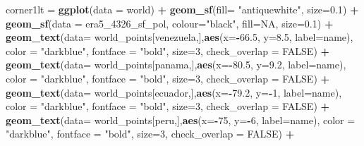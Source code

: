 \documentclass[12pt,twoside]{reedthesis}
\newenvironment{Shaded}{\begin{snugshade}}{\end{snugshade}}
\newcommand{\DataTypeTok}[1]{\textcolor[rgb]{0.13,0.29,0.53}{#1}}
\newcommand{\DecValTok}[1]{\textcolor[rgb]{0.00,0.00,0.81}{#1}}
\newcommand{\FloatTok}[1]{\textcolor[rgb]{0.00,0.00,0.81}{#1}}
\newcommand{\KeywordTok}[1]{\textcolor[rgb]{0.13,0.29,0.53}{\textbf{#1}}}
\newcommand{\NormalTok}[1]{#1}
\newcommand{\OperatorTok}[1]{\textcolor[rgb]{0.81,0.36,0.00}{\textbf{#1}}}
\newcommand{\OtherTok}[1]{\textcolor[rgb]{0.56,0.35,0.01}{#1}}
\newcommand{\StringTok}[1]{\textcolor[rgb]{0.31,0.60,0.02}{#1}}
\begin{document}
\begin{Shaded}
\begin{Highlighting}[]
\NormalTok{corner1lt =}\StringTok{ }\KeywordTok{ggplot}\NormalTok{(}\DataTypeTok{data =}\NormalTok{ world) }\OperatorTok{+}\StringTok{ }
\StringTok{  }\KeywordTok{geom_sf}\NormalTok{(}\DataTypeTok{fill=} \StringTok{"antiquewhite"}\NormalTok{,  }\DataTypeTok{size=}\FloatTok{0.1}\NormalTok{) }\OperatorTok{+}\StringTok{ }
\StringTok{  }\KeywordTok{geom_sf}\NormalTok{(}\DataTypeTok{data =}\NormalTok{ era5_}\DecValTok{4326}\NormalTok{_sf_pol, }\DataTypeTok{colour=}\StringTok{"black"}\NormalTok{, }\DataTypeTok{fill=}\OtherTok{NA}\NormalTok{, }\DataTypeTok{size=}\FloatTok{0.1}\NormalTok{) }\OperatorTok{+}
\StringTok{  }\KeywordTok{geom_text}\NormalTok{(}\DataTypeTok{data=}\NormalTok{ world_points[venezuela,],}\KeywordTok{aes}\NormalTok{(}\DataTypeTok{x=}\OperatorTok{-}\FloatTok{66.5}\NormalTok{, }\DataTypeTok{y=}\FloatTok{8.5}\NormalTok{, }\DataTypeTok{label=}\NormalTok{name), }\DataTypeTok{color =} \StringTok{"darkblue"}\NormalTok{, }\DataTypeTok{fontface =} \StringTok{"bold"}\NormalTok{, }\DataTypeTok{size=}\DecValTok{3}\NormalTok{, }\DataTypeTok{check_overlap =} \OtherTok{FALSE}\NormalTok{) }\OperatorTok{+}
\StringTok{  }\KeywordTok{geom_text}\NormalTok{(}\DataTypeTok{data=}\NormalTok{ world_points[panama,],}\KeywordTok{aes}\NormalTok{(}\DataTypeTok{x=}\OperatorTok{-}\FloatTok{80.5}\NormalTok{, }\DataTypeTok{y=}\FloatTok{9.2}\NormalTok{, }\DataTypeTok{label=}\NormalTok{name), }\DataTypeTok{color =} \StringTok{"darkblue"}\NormalTok{, }\DataTypeTok{fontface =} \StringTok{"bold"}\NormalTok{, }\DataTypeTok{size=}\DecValTok{3}\NormalTok{, }\DataTypeTok{check_overlap =} \OtherTok{FALSE}\NormalTok{) }\OperatorTok{+}\StringTok{ }
\StringTok{  }\KeywordTok{geom_text}\NormalTok{(}\DataTypeTok{data=}\NormalTok{ world_points[ecuador,],}\KeywordTok{aes}\NormalTok{(}\DataTypeTok{x=}\OperatorTok{-}\FloatTok{79.2}\NormalTok{, }\DataTypeTok{y=}\OperatorTok{-}\DecValTok{1}\NormalTok{, }\DataTypeTok{label=}\NormalTok{name), }\DataTypeTok{color =} \StringTok{"darkblue"}\NormalTok{, }\DataTypeTok{fontface =} \StringTok{"bold"}\NormalTok{, }\DataTypeTok{size=}\DecValTok{3}\NormalTok{, }\DataTypeTok{check_overlap =} \OtherTok{FALSE}\NormalTok{) }\OperatorTok{+}
\StringTok{  }\KeywordTok{geom_text}\NormalTok{(}\DataTypeTok{data=}\NormalTok{ world_points[peru,],}\KeywordTok{aes}\NormalTok{(}\DataTypeTok{x=}\OperatorTok{-}\DecValTok{75}\NormalTok{, }\DataTypeTok{y=}\OperatorTok{-}\DecValTok{6}\NormalTok{, }\DataTypeTok{label=}\NormalTok{name), }\DataTypeTok{color =} \StringTok{"darkblue"}\NormalTok{, }\DataTypeTok{fontface =} \StringTok{"bold"}\NormalTok{, }\DataTypeTok{size=}\DecValTok{3}\NormalTok{, }\DataTypeTok{check_overlap =} \OtherTok{FALSE}\NormalTok{) }\OperatorTok{+}

\end{Highlighting}
\end{Shaded}
\end{document}

